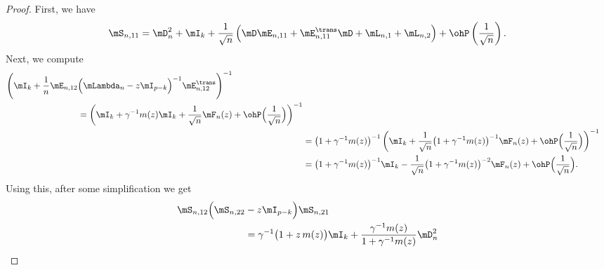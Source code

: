 \begin{proof}
    First, we have
    \[
        \mS_{n,11} 
            = 
                \mD_n^2 + \mI_k
                + 
                \frac{1}{\sqrt{n}}
                \left(
                    \mD \mE_{n,11}
                    +
                    \mE_{n,11}^\trans \mD
                    +
                    \mL_{n,1}
                    +
                    \mL_{n,2}
                \right)
                +
                \ohP\left( \frac{1}{\sqrt{n}} \right).
    \]
    Next, we compute
    \begin{align*}
        \begin{split}
        \Bigg(
            \mI_k
            +
            \frac{1}{n}
            \mE_{n,12}
            &\Big(
                \mLambda_n - z \mI_{p-k}
            \Big)^{-1}
            \mE_{n,12}^\trans
        \Bigg)^{-1} \\
            &=
                \left(
                    \mI_k
                    +
                    \gamma^{-1}
                    m( z )
                    \mI_k
                    +
                    \frac{1}{\sqrt{n}}
                    \mF_n(z)
                    +
                    \ohP\Big( \frac{1}{\sqrt{n}} \Big)
                \right)^{-1} 
        \end{split} \\
            &=
                \big(1 + \gamma^{-1} m(z)\big)^{-1}
                \left(
                    \mI_k
                    +
                    \frac{1}{\sqrt{n}}
                    \big( 1 + \gamma^{-1} m(z) \big)^{-1}
                    \mF_{n}(z)
                    +
                    \ohP\Big( \frac{1}{\sqrt{n}} \Big)
                \right)^{-1} \\
            &=
                \big( 1 + \gamma^{-1} m(z) \big)^{-1} \mI_k
                -
                \frac{1}{\sqrt{n}}
                \big( 1 + \gamma^{-1} m(z) \big)^{-2}
                \mF_{n}(z)
                +
                \ohP\Big( \frac{1}{\sqrt{n}} \Big).              
    \end{align*}
    Using this, after some simplification we get
    \[
        \begin{split}
            \mS_{n,12} \Big( \mS_{n,22} &- z \mI_{p-k} \Big) \mS_{n,21} \\
                &=
                \gamma^{-1}
                \big( 1 + z \, m(z) \big) \mI_k
                +
                \frac{\gamma^{-1} m(z)}
                     { 1 + \gamma^{-1} m(z)} \mD_n^2 \\

\end{split}\]
\end{proof}
